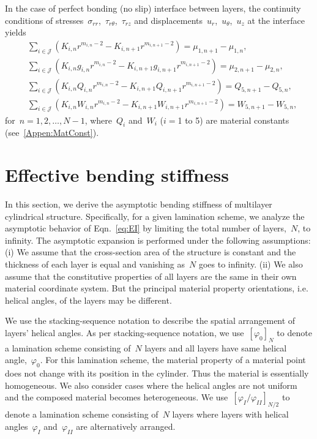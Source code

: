 \documentclass[preprint,10pt,times]{elsarticle}
\numberwithin{equation}{section}
\renewcommand{\>}{$\Rightarrow$}
\begin{document}
In the case of perfect bonding (no slip) interface between layers, the continuity conditions of stresses~$\sigma_{rr}$,~$\tau_{r\theta}$,~$\tau_{rz}$ and displacements~$u_{r}$,~$u_{\theta}$,~$u_z$ at the interface yields
\begin{subequations}
	\begin{align}
	& \sum_{i \in \mathcal{J}} \left( K_{i,n} r^{m_{i,n}-2} - K_{i,n+1} r^{m_{i,n+1}-2} \right) = \mu_{1,n+1} - \mu_{1,n}, \\
	& \sum_{i \in \mathcal{J}} \left( K_{i,n} g_{i,n} r^{m_{i,n}-2} - K_{i,n+1} g_{i,n+1} r^{m_{i,n+1}-2} \right) = \mu_{2,n+1} - \mu_{2,n}, \\
	& \sum_{i \in \mathcal{J}} \left( K_{i,n} Q_{i,n} r^{m_{i,n}-2} - K_{i,n+1} Q_{i,n+1} r^{m_{i,n+1}-2} \right) = Q_{5,n+1} - Q_{5,n}, \\
	& \sum_{i \in \mathcal{J}} \left( K_{i,n} W_{i,n} r^{m_{i,n}-2} - K_{i,n+1} W_{i,n+1} r^{m_{i,n+1}-2} \right) = W_{5,n+1} - W_{5,n},
	\end{align}
	\label{eq:noslip_interface}
\end{subequations}
for~$n = 1,2,\dots,N-1$, where~$Q_i$ and~$W_i$ ($i=$1 to 5) are material constants (see~\ref{Appen:MatConst}).





\section{Effective bending stiffness}
\label{sec:limit_analysis}
In this section, we derive the asymptotic bending stiffness of multilayer cylindrical structure.
Specifically, for a given lamination scheme, we analyze the asymptotic behavior of Eqn.~\eqref{eq:EI} by limiting the total number of layers,~$N$, to infinity.
The asymptotic expansion is performed under the following assumptions: (i) We assume that the cross-section area of the structure is constant and the thickness of each layer is equal and vanishing as~$N$ goes to infinity. (ii) We also assume that the constitutive properties of all layers are the same in their own material coordinate system. But the principal material property orientations, i.e. helical angles, of the layers may be different.

We use the stacking-sequence notation to describe the spatial arrangement of layers' helical angles. As per stacking-sequence notation, we use~$[\varphi_0]_N$ to denote a lamination scheme consisting of~$N$ layers and all layers have same helical angle,~$\varphi_0$. For this lamination scheme, the material property of a material point does not change with its position in the cylinder. Thus the material is essentially homogeneous.
We also consider cases where the helical angles are not uniform and the composed material becomes heterogeneous. We use~$[\varphi_I/\varphi_{II}]_{N/2}$ to denote a lamination scheme consisting of~$N$ layers where layers with helical angles~$\varphi_I$ and~$\varphi_{II}$ are alternatively arranged.
\end{document}
